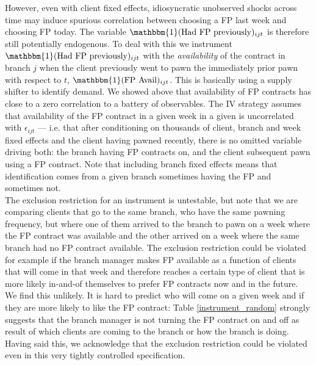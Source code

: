 However, even with client fixed effects, idiosyncratic unobserved shocks across time may induce spurious correlation between choosing a FP last week and choosing FP today. The variable $\mathbbm{1}(\text{Had FP previously})_{ijt}$ is therefore still potentially endogenous. To deal with this we instrument $\mathbbm{1}(\text{Had FP previously})_{ijt}$ with the \textit{availability} of the contract in branch $j$  when the client previously went to pawn the immediately prior pawn with respect to $t$, $\mathbbm{1}(\text{FP Avail})_{ijt}$. This is basically using a supply shifter to identify demand. We showed above that availability of FP contracts has close to a zero correlation to a battery of observables. The IV strategy assumes that availability of the FP contract in a given week in a given is uncorrelated with $\epsilon_{ijt}$ --- i.e. that after conditioning on thousands of client, branch and week fixed effects and the client having pawned recently, there is no omitted variable driving both: the branch having FP contracts on, and the client subsequent pawn using a FP contract. Note that including branch fixed effects means that identification comes from a given branch sometimes having the FP and sometimes not. \\

The exclusion restriction for an instrument is untestable, but note that we are comparing clients that go to the same branch, who have the same pawning frequency, but where one of them arrived to the branch to pawn on a week where the FP contract was available and the other arrived on a week where the same branch had no FP contract available.%
The exclusion restriction could be violated for example if the branch manager makes FP available as a function of clients that will come in that week and therefore reaches a certain type of client that is more likely in-and-of themselves to prefer FP contracts now and in the future. We find this unlikely. It is hard to predict who will come on a given week and if they are more likely to like the FP contract: Table \ref{instrument_random} strongly suggests that the branch manager is not turning the FP contract on and off as result of which clients are coming to the branch or how the branch is doing. Having said this, we acknowledge that the exclusion restriction could be violated even in this very tightly controlled specification.\\

